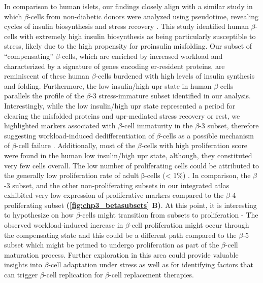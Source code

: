 \par In comparison to human islets, our findings closely align with a similar study in which $\beta$-cells from non-diabetic donors were analyzed using pseudotime, revealing cycles of insulin biosynthesis and stress recovery \textbf{\cite{xin_pseudotime_2018}}. This study identified human $\beta$-cells with extremely high insulin biosynthesis as being particularly susceptible to stress, likely due to the high propensity for proinsulin misfolding. Our subset of ``compensating'' $\beta$-cells, which are enriched by increased workload and characterized by a signature of genes encoding \gls{er}-resident proteins, are reminiscent of these human $\beta$-cells burdened with high levels of insulin synthesis and folding. Furthermore, the low insulin/high \gls{upr} state in human $\beta$-cells parallels the profile of the $\beta$-3 stress-immature subset identified in our analysis. Interestingly, while the low insulin/high \gls{upr} state represented a period for clearing the misfolded proteins and \gls{upr}-mediated stress recovery or rest, we highlighted markers associated with $\beta$-cell immaturity in the $\beta$-3 subset, therefore suggesting workload-induced dedifferentiation of $\beta$-cells as a possible mechanism of $\beta$-cell failure \textbf{\cite{wang_pancreatic_2014}}. Additionally, most of the $\beta$-cells with high proliferation score were found in the human low insulin/high \gls{upr} state, although, they constituted very few cells overall. The low number of proliferating cells could be attributed to the generally low proliferation rate of adult β-cells (< 1\%) \textbf{\cite{ackermann_molecular_2007}}. In comparison, the $\beta$-3 subset, and the other non-proliferating subsets in our integrated atlas exhibited very low expression of proliferative markers compared to the $\beta$-4 proliferating subset \textbf{(\autoref{fig:chp3_betasubsets} B)}. At this point, it is interesting to hypothesize on how $\beta$-cells might transition from subsets to proliferation - The observed workload-induced increase in $\beta$-cell proliferation might occur through the compensating state and this could be a different path compared to the $\beta$-5 subset which might be primed to undergo proliferation as part of the $\beta$-cell maturation process. Further exploration in this area could provide valuable insights into $\beta$-cell adaptation under stress as well as for identifying factors that can trigger $\beta$-cell replication for $\beta$-cell replacement therapies.\\



